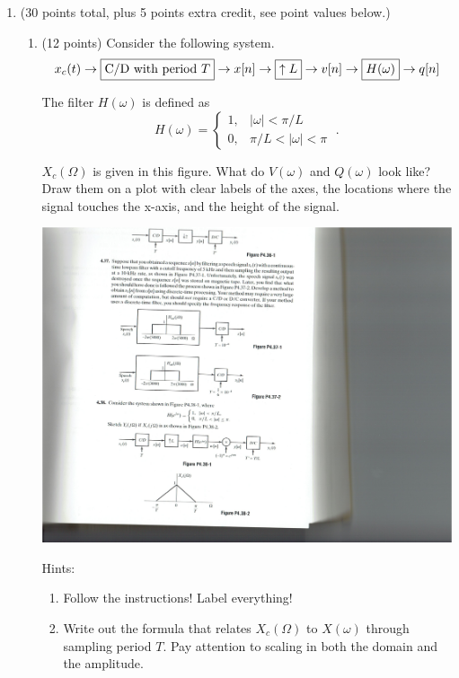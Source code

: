 \documentclass[]{siamltex}
\begin{document}
\begin{enumerate}
\newpage

\item (30 points total, plus 5 points extra credit, see point values below.) 
	\begin{enumerate}
	\item (12 points) Consider the following system. $$x_c(t)  \rightarrow \fbox{C/D with period $T$}  \rightarrow x[n] \rightarrow \fbox{$\uparrow L$}  \rightarrow v[n] \rightarrow \fbox{$H(\omega)$} \rightarrow q[n] $$
	
	The filter $H(\omega)$ is defined as $$H(\omega) = \left\{ \begin{matrix} 1, & |\omega| < \pi/L \\ 0 , & \pi/L < |\omega| < \pi\end{matrix} \right. \;.$$
	
	$X_c(\Omega)$ is given in this figure. What do $V(\omega)$ and $Q(\omega)$ look like? Draw them on a plot with clear labels of the axes, the locations where the signal touches the x-axis, and the height of the signal.
	
	\includegraphics{osb4382}
	
		Hints: 
		\begin{enumerate}
			\item Follow the instructions! Label everything!
			\item Write out the formula that relates $X_c(\Omega)$ to $X(\omega)$ through sampling period $T$. Pay attention to scaling in both the domain and the amplitude.
		\end{enumerate}
	

\end{enumerate}
\end{enumerate}
\end{document}
